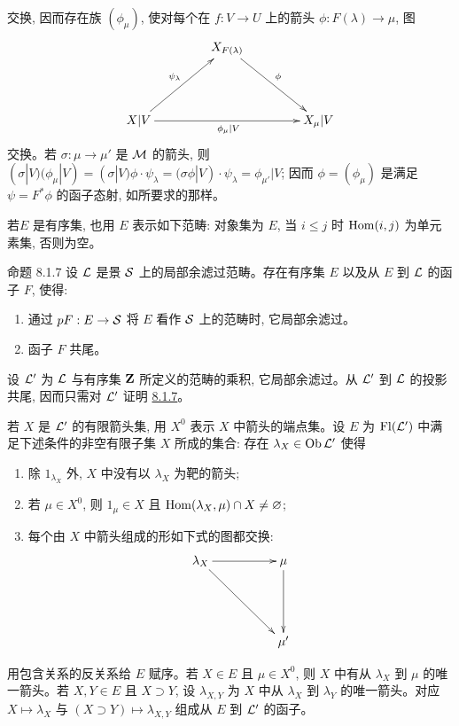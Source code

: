 交换, 因而存在族 $(\phi_\mu)$, 使对每个在 $f:V\to U$ 上的箭头 $\phi:F(\lambda)\to\mu$, 图
\[
\xymatrix@=1.5cm{
                              & X_{F(\lambda)} \ar[rd]^{\phi}      &    \\
X|V \ar[rr]_{\phi_\mu|V} \ar[ru]^{\psi_\lambda} &
                              & X_\mu|V
}
\]
交换。若 $\sigma:\mu\to\mu'$ 是 ${\mathcal M}$ 的箭头, 则 $(\sigma|V)(\phi_\mu|V)=(\sigma|V)\phi\cdot\psi_\lambda
=(\sigma\phi|V)\cdot\psi_\lambda=\phi_{\mu'}|V$; 因而 $\phi=(\phi_\mu)$ 是满足 $\psi=F^{\ast}\phi$ 的函子态射, 如所要求的那样。

若\pageoriginale $E$ 是有序集, 也用 $E$ 表示如下范畴: 对象集为 $E$, 当 $i\leq j$ 时 $\operatorname{Hom}(i,j)$ 为单元素集, 否则为空。

\begin{enonce*}{命题 8.1.7}
设 ${\mathcal L}$ 是景 ${\mathcal S}$ 上的局部余滤过范畴。存在有序集 $E$ 以及从 $E$ 到 ${\mathcal L}$ 的函子 $F$, 使得:
\begin{enumerate}
\renewcommand{\theenumi}{\roman{enumi}}
\renewcommand{\labelenumi}{(\theenumi)}
\item 通过 $pF:E\to\Ss$ 将 $E$ 看作 ${\mathcal S}$ 上的范畴时, 它局部余滤过。
\item 函子 $F$ 共尾。
\end{enumerate}
\end{enonce*}

设 ${\mathcal L}'$ 为 ${\mathcal L}$ 与有序集 $\mathbf{Z}$ 所定义的范畴的乘积, 它局部余滤过。从 ${\mathcal L}'$ 到 ${\mathcal L}$ 的投影共尾, 因而只需对 ${\mathcal L}'$ 证明 \hyperref[V.prop8.1.7]{8.1.7}。

若 $X$ 是 ${\mathcal L}'$ 的有限箭头集, 用 $X^0$ 表示 $X$ 中箭头的端点集。设 $E$ 为 $\mathrm{Fl}({\mathcal L}')$ 中满足下述条件的非空有限子集 $X$ 所成的集合: 存在 $\lambda_X\in\operatorname{Ob}{\mathcal L}'$ 使得
\begin{enumerate}
\renewcommand{\theenumi}{\alph{enumi}}
\renewcommand{\labelenumi}{\theenumi)}
\item 除 $1_{\lambda_X}$ 外, $X$ 中没有以 $\lambda_X$ 为靶的箭头;

\item 若 $\mu\in X^0$, 则 $1_\mu\in X$ 且 $\operatorname{Hom}(\lambda_X,\mu)\cap X\neq\varnothing$;

\item 每个由 $X$ 中箭头组成的形如下式的图都交换:
\[
\xymatrix@=1.75cm{
\lambda_X \ar[r] \ar[rd]& \mu \ar[d]\\
            & \mu'
}
\]
\end{enumerate}

用包含关系的反关系给 $E$ 赋序。若 $X\in E$ 且 $\mu\in X^0$, 则 $X$ 中有从 $\lambda_X$ 到 $\mu$ 的唯一箭头。若 $X,Y\in E$ 且 $X\supset Y$, 设 $\lambda_{X,Y}$ 为 $X$ 中从 $\lambda_X$ 到 $\lambda_Y$ 的唯一箭头。对应 $X\mapsto\lambda_X$ 与 $(X\supset Y)\mapsto\lambda_{X,Y}$ 组成从 $E$ 到 ${\mathcal L}'$ 的函子。

